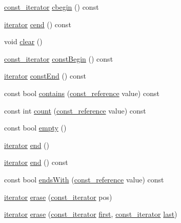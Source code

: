 \begin{DoxyCompactItemize}
\item 
\hyperlink{classprism_1_1_list_a82987892223347376baec1efd26aa655}{const\+\_\+iterator} \hyperlink{classprism_1_1_list_a305be84975076ea140f6f32be946225f}{cbegin} () const 
\item 
\hyperlink{classprism_1_1_list_aa95cb21a8754f91406f53bd0315513af}{iterator} \hyperlink{classprism_1_1_list_aab544551cf58b5ce23584c4f16d00d7e}{cend} () const 
\item 
void \hyperlink{classprism_1_1_list_a1e7dd9642cde1dca8834c8771560cd6b}{clear} ()
\item 
\hyperlink{classprism_1_1_list_a82987892223347376baec1efd26aa655}{const\+\_\+iterator} \hyperlink{classprism_1_1_list_af83c7a275d29cb26b5807c3b4cbbebf4}{const\+Begin} () const 
\item 
\hyperlink{classprism_1_1_list_aa95cb21a8754f91406f53bd0315513af}{iterator} \hyperlink{classprism_1_1_list_ab6464c9488a804007b2953a6a21b6e46}{const\+End} () const 
\item 
const bool \hyperlink{classprism_1_1_list_a47cd243e9c5db6058481d63ecc6ed5b7}{contains} (\hyperlink{classprism_1_1_list_a31c013c3f9135c28c3c4bf489fbeb322}{const\+\_\+reference} value) const 
\item 
const int \hyperlink{classprism_1_1_list_a7dbdab274aecfdc26b7d208f80772a78}{count} (\hyperlink{classprism_1_1_list_a31c013c3f9135c28c3c4bf489fbeb322}{const\+\_\+reference} value) const 
\item 
const bool \hyperlink{classprism_1_1_list_ae6b3ff8409a6548b695a9173a8bd4555}{empty} ()
\item 
\hyperlink{classprism_1_1_list_aa95cb21a8754f91406f53bd0315513af}{iterator} \hyperlink{classprism_1_1_list_a66e9cfc2a547294304d4fae086297bec}{end} ()
\item 
\hyperlink{classprism_1_1_list_aa95cb21a8754f91406f53bd0315513af}{iterator} \hyperlink{classprism_1_1_list_a36cedb2a64bbbe94da0c8e275132497c}{end} () const 
\item 
const bool \hyperlink{classprism_1_1_list_aff95005df96b82ff2b190c09a4845b30}{ends\+With} (\hyperlink{classprism_1_1_list_a31c013c3f9135c28c3c4bf489fbeb322}{const\+\_\+reference} value) const 
\item 
\hyperlink{classprism_1_1_list_aa95cb21a8754f91406f53bd0315513af}{iterator} \hyperlink{classprism_1_1_list_a9dcece97613f71fd9fac75d65f741ab4}{erase} (\hyperlink{classprism_1_1_list_a82987892223347376baec1efd26aa655}{const\+\_\+iterator} pos)
\item 
\hyperlink{classprism_1_1_list_aa95cb21a8754f91406f53bd0315513af}{iterator} \hyperlink{classprism_1_1_list_a632ad7eb2a121216e2cd9d3b810819fc}{erase} (\hyperlink{classprism_1_1_list_a82987892223347376baec1efd26aa655}{const\+\_\+iterator} \hyperlink{classprism_1_1_list_a403997c37906888fb96e612557fc7a05}{first}, \hyperlink{classprism_1_1_list_a82987892223347376baec1efd26aa655}{const\+\_\+iterator} \hyperlink{classprism_1_1_list_a674a1f2acb2580b63ec54964334721dd}{last})

\end{DoxyCompactItemize}
